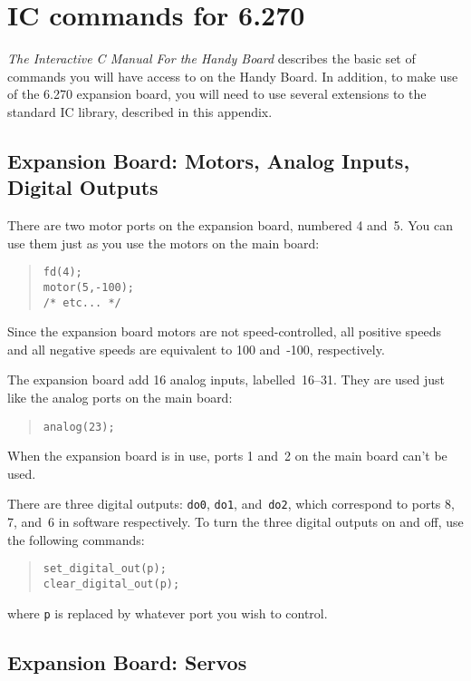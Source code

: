 \chapter{IC commands for 6.270}

{\sl The Interactive C Manual For the Handy Board\/} describes the basic
set of commands you will 
have access to on the Handy Board.  In addition, to make use of the
6.270 expansion board, you will need to use several extensions to the
standard IC library, described in this appendix.

\section{Expansion Board: Motors, Analog Inputs, Digital Outputs}

There are two motor ports on the expansion board, numbered 4 and~5.
You can use them just as you use the motors on the main board:
\begin{quote}
\begin{verbatim}
fd(4);
motor(5,-100);
/* etc... */
\end{verbatim}
\end{quote}
Since the expansion board motors are not speed-controlled, all
positive speeds and all negative speeds are equivalent to 100
and~-100, respectively.

The expansion board add 16 analog inputs, labelled~16--31.  They are
used just like the analog ports on the main board:
\begin{quote}
\begin{verbatim}
analog(23);
\end{verbatim}
\end{quote}
When the expansion board is in use, ports 1 and~2 on the main board
can't be used.

There are three digital outputs: \texttt{do0}, \texttt{do1},
and~\texttt{do2}, which correspond to ports 8, 7, and~6 in software respectively. To turn the three digital outputs on and off, use the following commands:
\begin{quote}
\begin{verbatim}
set_digital_out(p);
clear_digital_out(p);
\end{verbatim}
\end{quote}
where \verb^p^ is replaced by whatever port you wish to control.

\section{Expansion Board: Servos}

